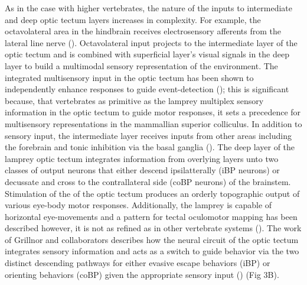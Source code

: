 \documentclass{ar-1col}
\begin{document}
As in the case with higher vertebrates, the nature of the inputs to intermediate and deep optic tectum layers increases in complexity. For example, the octavolateral area in the hindbrain receives electrosensory afferents from the lateral line nerve (\cite{bodznick1981electroreception}). Octavolateral input projects to the intermediate layer of the optic tectum and is combined with superficial layer's visual signals in the deep layer to build a multimodal sensory representation of the environment. The integrated multisensory input in the optic tectum has been shown to independently enhance responses to guide event-detection (\cite{kardamakis2016spatiotemporal}); this is significant because, that vertebrates as primitive as the lamprey multiplex sensory information in the optic tectum to guide motor responses, it sets a precedence for multisensory representations in the mammallian superior colliculus. In addition to sensory input, the intermediate layer receives inputs from other areas including the forebrain and tonic inhibition via the basal ganglia (\cite{robertson2006afferents}). The deep layer of the lamprey optic tectum integrates information from overlying layers unto two classes of output neurons that either descend ipsilatterally (iBP neurons) or decussate and cross to the contrallateral side (coBP neurons) of the brainstem. Stimulation of the of the optic tectum produces an orderly topographic output of various eye-body motor responses. Additionally, the lamprey is capable of horizontal eye-movements and a pattern for tectal oculomotor mapping has been described however, it is not as refined as in other vertebrate systems (\cite{saitoh2007tectal}). The work of Grillnor and collaborators describes how the neural circuit of the optic tectum integrates sensory information and acts as a switch to guide behavior via the two distinct descending pathways for either evasive escape behaviors (iBP) or orienting behaviors (coBP) given the appropriate sensory input (\cite{suzuki2019role}) (Fig 3B).
\end{document}
